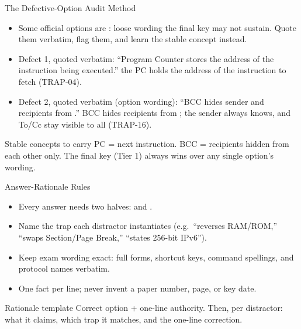 \documentclass[aspectratio=169]{beamer}
\begin{document}
\begin{frame}{The Defective-Option Audit Method}
  \begin{itemize}
    \item Some official options are : loose wording the final
      key may not sustain. Quote them verbatim, flag them, and learn the
      stable concept instead.
    \item Defect 1, quoted verbatim: ``Program Counter stores the address of
      the  instruction being executed.''  the PC holds
      the address of the  instruction to fetch (TRAP-04).
    \item Defect 2, quoted verbatim (option wording): ``BCC hides sender and
      recipients from .''  BCC hides recipients
      from ; the sender always knows, and To/Cc stay visible
      to all (TRAP-16).
  \end{itemize}
  \begin{block}{Stable concepts to carry}
    PC = next instruction. BCC = recipients hidden from each other only.
    The final key (Tier 1) always wins over any single option's wording.
  \end{block}
\end{frame}

\begin{frame}{Answer-Rationale Rules}
  \begin{itemize}
    \item Every answer needs two halves:  and
      .
    \item Name the trap each distractor instantiates (e.g.\ ``reverses
      RAM/ROM,'' ``swaps Section/Page Break,'' ``states 256-bit IPv6'').
    \item Keep exam wording exact: full forms, shortcut keys, command
      spellings, and protocol names verbatim.
    \item One fact per line; never invent a paper number, page, or key date.
  \end{itemize}
  \begin{alertblock}{Rationale template}
    Correct option + one-line authority. Then, per distractor: what it
    claims, which trap it matches, and the one-line correction.
  \end{alertblock}
\end{frame}
\end{document}
